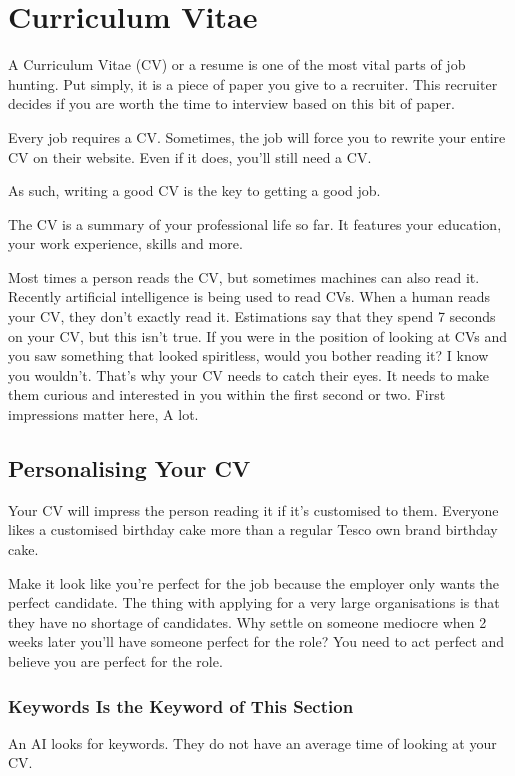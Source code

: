 \documentclass{article}
\begin{document}
\section{Curriculum Vitae}
A Curriculum Vitae (CV) or a resume is one of the most vital parts of
job hunting. Put simply, it is a piece of paper you give to a recruiter.
This recruiter decides if you are worth the time to interview based on
this bit of paper.

Every job requires a CV. Sometimes, the job will force you to rewrite
your entire CV on their website. Even if it does, you'll still need a
CV.

As such, writing a good CV is the key to getting a good job.

The CV is a summary of your professional life so far. It features your
education, your work experience, skills and more.

Most times a person reads the CV, but sometimes machines can also read
it. Recently artificial intelligence is being used to read CVs. When a
human reads your CV, they don't exactly read it. Estimations say that
they spend 7 seconds on your CV, but this isn't true. If you were in the
position of looking at CVs and you saw something that looked spiritless,
would you bother reading it? I know you wouldn't. That's why your CV
needs to catch their eyes. It needs to make them curious and interested
in you within the first second or two. First impressions matter here, A
lot.
\subsection{Personalising Your CV}
Your CV will impress the person reading it if it's customised to them.
Everyone likes a customised birthday cake more than a regular Tesco own
brand birthday cake.

Make it look like you're perfect for the job because the employer only
wants the perfect candidate. The thing with applying for a very large
organisations is that they have no shortage of candidates. Why settle on
someone mediocre when 2 weeks later you'll have someone perfect for the
role? You need to act perfect and believe you are perfect for the role.

\subsubsection{Keywords Is the Keyword of This Section}
An AI looks for keywords. They do not have an average time of looking at
your CV.
\end{document}
